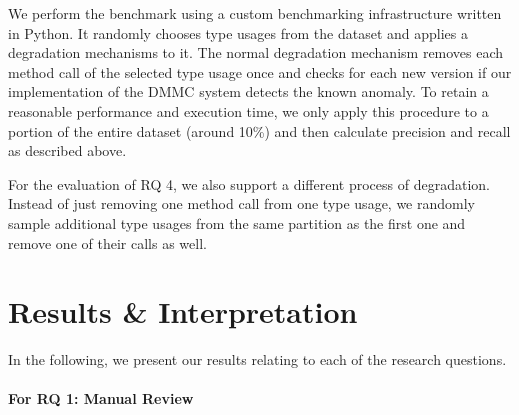 We perform the benchmark using a custom benchmarking infrastructure written in Python.
It randomly chooses type usages from the dataset and applies a degradation mechanisms to it.
The normal degradation mechanism removes each method call of the selected type usage once and checks for each new version if our implementation of the $\text{DMMC}$ system detects the known anomaly.
To retain a reasonable performance and execution time, we only apply this procedure to a portion of the entire dataset (around 10\%) and then calculate precision and recall as described above.

For the evaluation of RQ 4, we also support a different process of degradation.
Instead of just removing one method call from one type usage, we randomly sample additional type usages from the same partition as the first one and remove one of their calls as well.

\section{Results \& Interpretation}

In the following, we present our results relating to each of the research questions.

\paragraph{For RQ 1: Manual Review}

